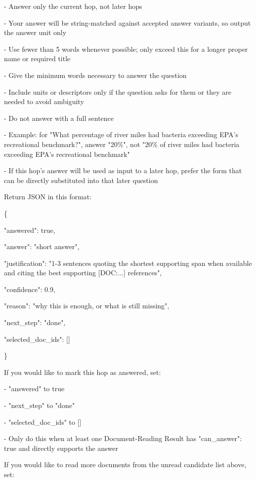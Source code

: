 \begin{tcolorbox}
\begin{scriptsize}
- Answer only the current hop, not later hops\par
- Your answer will be string-matched against accepted answer variants, so output the answer unit only\par
- Use fewer than 5 words whenever possible; only exceed this for a longer proper name or required title\par
- Give the minimum words necessary to answer the question\par
- Include units or descriptors only if the question asks for them or they are needed to avoid ambiguity\par
- Do not answer with a full sentence\par
- Example: for "What percentage of river miles had bacteria exceeding EPA's recreational benchmark?", answer "20\%", not "20\% of river miles had bacteria exceeding EPA's recreational benchmark"\par
- If this hop's answer will be used as input to a later hop, prefer the form that can be directly substituted into that later question\par
\mbox{}\par
Return JSON in this format:\par
\{\par
  "answered": true,\par
  "answer": "short answer",\par
  "justification": "1-3 sentences quoting the shortest supporting span when available and citing the best supporting [DOC:...] references",\par
  "confidence": 0.9,\par
  "reason": "why this is enough, or what is still missing",\par
  "next\_step": "done",\par
  "selected\_doc\_ids": []\par
\}\par
\mbox{}\par
If you would like to mark this hop as answered, set:\par
- "answered" to true\par
- "next\_step" to "done"\par
- "selected\_doc\_ids" to []\par
- Only do this when at least one Document-Reading Result has "can\_answer": true and directly supports the answer\par
\mbox{}\par
If you would like to read more documents from the unread candidate list above, set:\par

\end{scriptsize}
\end{tcolorbox}
